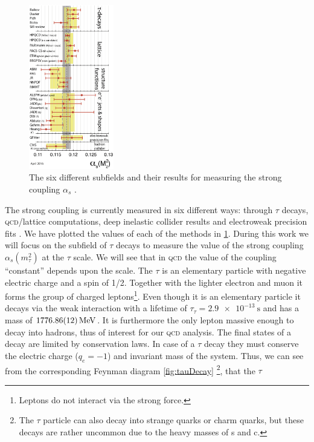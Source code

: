 \documentclass[../../index.tex]{subfiles}
\begin{document}
\begin{figure}
  \centering \vspace{-0.75cm}
  \includegraphics[width=0.33\textwidth]{./images/alphasDetermination.eps}
  \captionsetup{format=plain}
  \caption{The six different subfields and their results for measuring the
    strong coupling \(\alpha_s\) \cite{PDG2018}.}
  \label{fig:alphaSDetermination}
\end{figure}
The strong coupling is currently measured in six different ways: through
\(\tau\) decays, \textsc{qcd}\-/lattice computations, deep inelastic collider
results and electroweak precision fits \cite{PDG2018}. We have plotted the
values of each of the methods in \cref{fig:alphaSDetermination}. During this
work we will focus on the subfield of \(\tau\) decays to measure the value of
the strong coupling \(\alpha_s(m_\tau^2)\) at the \(\tau\) scale. We will see
that in \textsc{qcd} the value of the coupling ``constant'' depends upon the
scale. The \(\tau\) is an elementary particle with negative electric charge and
a spin of 1/2. Together with the lighter electron and muon it forms the group of
charged leptons\footnote{Leptons do not interact via the strong force.}. Even
though it is an elementary particle it decays via the weak interaction with a
lifetime of \(\tau_\tau=\SI{2.9e-13}{\second}\) and has a mass of
\(\SI{1776.86\pm0.12}{\mega\electronvolt}\)\cite{PDG2018}. It is furthermore the
only lepton massive enough to decay into hadrons, thus of interest for our
\textsc{qcd} analysis. The final states of a decay are limited by conservation
laws. In case of a \(\tau\) decay they must conserve the electric charge
(\(q_e=-1\)) and invariant mass of the system. Thus, we can see from the
corresponding Feynman diagram \cref{fig:tauDecay} \footnote{The \(\tau\)
  particle can also decay into strange quarks or charm quarks, but these decays
  are rather uncommon due to the heavy masses of s and c.}, that the \(\tau\)
\end{document}
